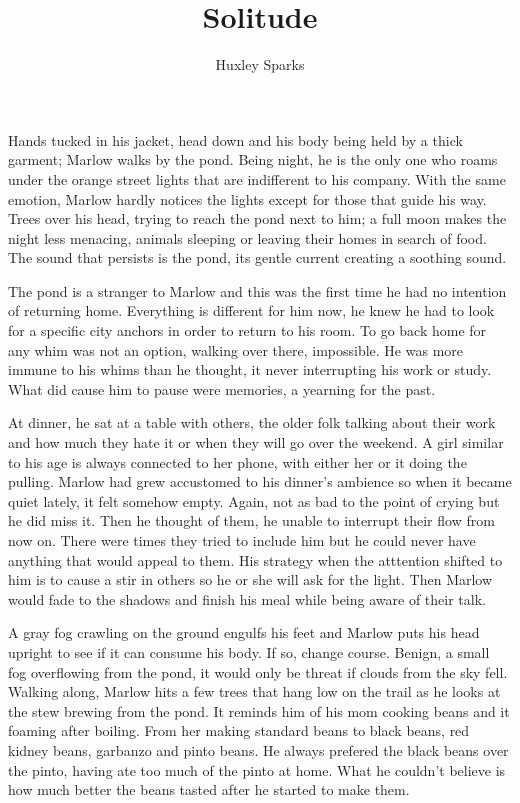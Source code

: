 \title{Solitude}
\author{Huxley Sparks}

		Hands tucked in his jacket, head down and his body being held by a thick garment; Marlow walks by the pond. Being night, he is the only one who roams
	under the orange street lights that are indifferent to his company. With the same emotion, Marlow hardly notices the lights except for those that guide his
	way. Trees over his head, trying to reach the pond next to him; a full moon makes the night less menacing, animals sleeping or leaving their homes in search
	of food. The sound that persists is the pond, its gentle current creating a soothing sound.

		The pond is a stranger to Marlow and this was the first time he had no intention of returning home. Everything is different for him now, he knew
 	he had to look for a specific city anchors in order to return to his room. To go back home for any whim was not an option, walking over there, impossible.
	He was more immune to his whims than he thought, it never interrupting his work or study. What did cause him to pause were memories, a yearning for the past.

		At dinner, he sat at a table with others, the older folk talking about their work and how much they hate it or when they will go over the weekend. A
	girl similar to his age is always connected to her phone, with either her or it doing the pulling. Marlow had grew accustomed to his dinner's ambience so when
	it became quiet lately, it felt somehow empty. Again, not as bad to the point of crying but he did miss it. Then he thought of them, he unable to interrupt
	their flow from now on. There were times they tried to include him but he could never have anything that would appeal to them. His strategy when the atttention
	shifted to him is to cause a stir in others so he or she will ask for the light. Then Marlow would fade to the shadows and finish his meal while being aware
	of their talk.	

		A gray fog crawling on the ground engulfs his feet and Marlow puts his head upright to see if it can consume his body. If so, change course. Benign,
	a small fog overflowing from the pond, it would only be threat if clouds from the sky fell. Walking along, Marlow hits a few trees that hang low on the trail
	as he looks at the stew brewing from the pond. It reminds him of his mom cooking beans and it foaming after boiling. From her making standard beans to black
	beans, red kidney beans, garbanzo and pinto beans. He always prefered the black beans over the pinto, having ate too much of the pinto at home. What he
	couldn't believe is how much better the beans tasted after he started to make them.

